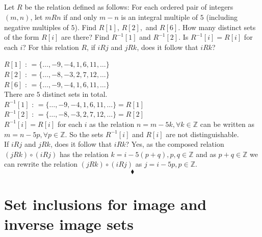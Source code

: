 \subsection{}
\begin{tcolorbox}
Let $R$ be the relation defined as follows: For each ordered pair of integers $(m,n)$, let $mRn$ if and only $m-n$ is an integral multiple of $5$ (including negative multiples of $5$). Find $R[1],\, R[2],$ and $R[6]$. How many distinct sets of the form $R[i]$ are there? Find $R^{-1}[1]$ and $R^{-1}[2]$. Is $R^{-1}[i]=R[i]$ for each $i$? For this relation $R$, if $iRj$ and $jRk$, does it follow that $iRk$?
 \end{tcolorbox}
$$ $$ 
\textbf{$R[1]$ }:  $=\{\dots, -9,-4,1,6,11,\dots\}$\\
\textbf{$R[2]$ }:  $=\{\dots, -8,-3,2,7,12,\dots\}$\\
\textbf{$R[6]$ }:  $=\{\dots, -9,-4,1,6,11,\dots\}$\\
There are $5$ distinct sets in total. \\
\textbf{$R^{-1}[1]$ }:  $=\{\dots, -9,-4,1,6,11,\dots\}=R[1]$\\
\textbf{$R^{-1}[2]$ }:  $=\{\dots, -8,-3,2,7,12,\dots\}=R[2]$\\
$R^{-1}[i]=R[i]$ for each $i$ as the relation $n=m-5k,\forall k\in \mathbb{Z}$ can be written as $m=n-5p,\forall p\in \mathbb{Z}$. So the sets $R^{-1}[i]$ and $R[i]$ are not distinguishable.\\
If $iRj$ and $jRk$, does it follow that $iRk$? Yes, as the composed relation $(jRk)\circ (iRj) $ has the relation $k=i-5(p+q), p,q\in \mathbb{Z}$ and as $p+q\in\mathbb{Z}$ we can rewrite the relation $(jRk)\circ (iRj) $ as $j= i-5p, p\in\mathbb{Z}$.
$$\blacklozenge$$
\newpage

 \section{Set inclusions for image and inverse image sets}

